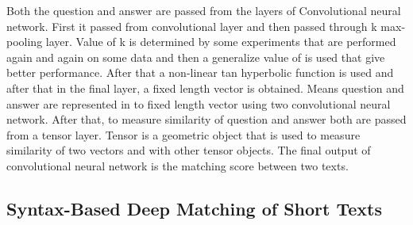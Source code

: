 \documentclass{doublecol-new}
\theoremstyle{TH}{
\newtheorem{lemma}{Lemma}
\newtheorem{theorem}[lemma]{Theorem}
\newtheorem{corrolary}[lemma]{Corrolary}
\newtheorem{conjecture}[lemma]{Conjecture}
\newtheorem{proposition}[lemma]{Proposition}
\newtheorem{claim}[lemma]{Claim}
\newtheorem{stheorem}[lemma]{Wrong Theorem}
\newtheorem{algorithm}{Algorithm}
}
\theoremstyle{THrm}{
\newtheorem{definition}{Definition}[section]
\newtheorem{question}{Question}[section]
\newtheorem{remark}{Remark}
\newtheorem{scheme}{Scheme}
}
\theoremstyle{THhit}{
\newtheorem{case}{Case}[section]
}
\begin{document}
Both the question and answer are passed from the layers of Convolutional neural network. First it passed from convolutional layer and then passed through k max-pooling layer. Value of k is determined by some experiments that are performed again and again on some data and then a generalize value of is used that give better performance. After that a non-linear tan hyperbolic function is used and after that in the final layer, a fixed length vector is obtained. Means question and answer are represented in to fixed length vector using two convolutional neural network. After that, to measure similarity of question and answer both are passed from a tensor layer. Tensor is a geometric object that is used to measure similarity of two vectors and with other tensor objects. The final output of convolutional neural network is the matching score between two texts. 



\subsection{Syntax-Based Deep Matching of Short Texts}
\end{document}
